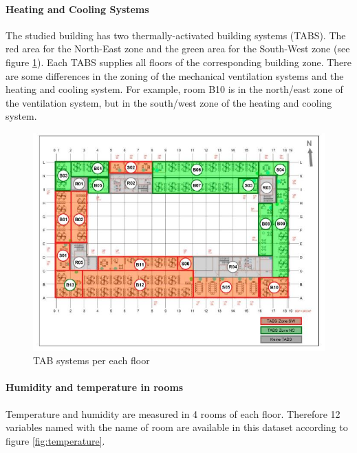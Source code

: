 \paragraph{Heating and Cooling Systems} The studied building has two thermally-activated building systems (TABS). The red area for the North-East zone and the green area for the South-West zone (see figure \ref{fig:heating}). Each TABS supplies all floors of the corresponding building zone. There are some differences in the zoning of the mechanical ventilation systems and the heating and
cooling system. For example, room B10 is in the north/east zone of the ventilation system, but
in the south/west zone of the heating and cooling system.  

\begin{figure}[h!]
  \vspace{0.5em} %
  \includegraphics[scale=0.6]{Figures/heating.jpg}
  \caption{TAB systems per each floor \cite{roman2015}}  
  \label{fig:heating}
\end{figure}

\paragraph{Humidity and temperature in rooms}

Temperature and humidity are measured in 4 rooms of each floor. Therefore 12 variables named with the name of room are available in this dataset according to figure \ref{fig:temperature}.  

